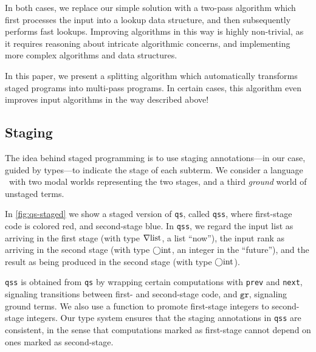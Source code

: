 \begin{abstrsyn}
In both cases, we replace our simple solution with a two-pass algorithm which
first processes the input into a lookup data structure, and then subsequently
performs fast lookups. Improving algorithms in this way is highly non-trivial,
as it requires reasoning about intricate algorithmic concerns, and implementing
more complex algorithms and data structures.  

In this paper, we present a splitting algorithm which automatically transforms
staged programs into multi-pass programs. In certain cases, this algorithm even
improves input algorithms in the way described above!


\subsection{Staging}


The idea behind staged programming is to use staging annotations---in our case,
guided by types---to indicate the stage of each subterm. We consider a
language \lang\ with two modal worlds representing the two stages, and a third
{\em ground} world of unstaged terms.

In \ref{fig:qs-staged} we show a staged version of \texttt{qs}, called
\texttt{qss}, where first-stage code is colored red, and second-stage blue. In
\texttt{qss}, we regard the input list as arriving in the first stage
(with type $\nabla\mathrm{list}$, a list ``now''), the input rank as arriving in
the second stage (with type $\bigcirc{\rm int}$, an integer in the ``future''), and the
result as being produced in the second stage (with type $\bigcirc{\rm int}$).

\texttt{qss} is obtained from \texttt{qs} by wrapping certain computations with
\texttt{prev} and \texttt{next}, signaling transitions between first- and
second-stage code, and $\texttt{gr}$, signaling ground terms.  
%
We also use a function
to promote first-stage integers to second-stage integers.
%
Our type system ensures that the staging annotations in \texttt{qss} are
consistent, in the sense that computations marked as first-stage cannot depend
on ones marked as second-stage.


\end{abstrsyn}
